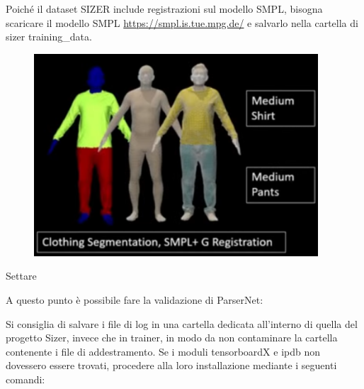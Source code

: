 \medskip\medskip\medskip





\medskip\medskip\medskip

Poiché il dataset SIZER include registrazioni sul modello SMPL, bisogna scaricare il modello SMPL \url{https://smpl.is.tue.mpg.de/} e salvarlo nella cartella di sizer training\_{}data.

\medskip\medskip\medskip

\begin{figure}[ht!]
  \centering
  \includegraphics[scale=1]{Images/SizerPic/Sizer2.png}
    \label{fig:Sizer2}
\end{figure}

\medskip\medskip\medskip

Settare

\medskip\medskip\medskip




\medskip

A questo punto è possibile fare la validazione di ParserNet:







\medskip

Si consiglia di salvare i file di log in una cartella dedicata all’interno di quella del progetto Sizer, invece che in trainer, in modo da non contaminare la cartella contenente i file di addestramento.
Se i moduli tensorboardX e ipdb non dovessero essere trovati, procedere alla loro installazione mediante i seguenti comandi:

